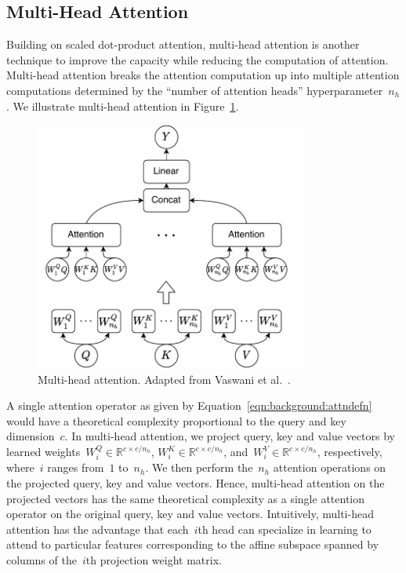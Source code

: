 \subsection{Multi-Head Attention}

Building on scaled dot-product attention, multi-head attention is another
technique to improve the capacity while reducing the computation of attention.
Multi-head attention breaks the attention computation up into multiple
attention computations determined by the ``number of attention heads''
hyperparameter~$n_h$.
We illustrate multi-head attention in Figure~\ref{fig:background:multiheadattn}.

\begin{figure}
\centering
\includegraphics[width=0.8\textwidth]{Figures/multihead-attention.pdf}
\caption{Multi-head attention.
         Adapted from Vaswani et al.~\cite{vaswani2017attention}.}
\label{fig:background:multiheadattn}
\end{figure}

A single attention operator as given by Equation~\ref{eqn:background:attndefn}
would have a theoretical complexity proportional to the query and key
dimension~$c$.
In multi-head attention, we project query, key and value vectors by learned
weights~$W^Q_i \in \mathbb{R}^{c\times c/n_h}$,
$W^K_i \in \mathbb{R}^{c\times c/n_h}$,
and~$W^V_i \in \mathbb{R}^{c\times c/n_h}$, respectively, where~$i$
ranges from~$1$ to~$n_h$.
We then perform the~$n_h$ attention operations on the projected query, key and
value vectors.
Hence, multi-head attention on the projected vectors has the same theoretical
complexity as a single attention operator on the original query, key and value
vectors.
Intuitively, multi-head attention has the advantage that each~$i$th head can
specialize in learning to attend to particular features corresponding to the
affine subspace spanned by columns of the~$i$th projection weight matrix.

